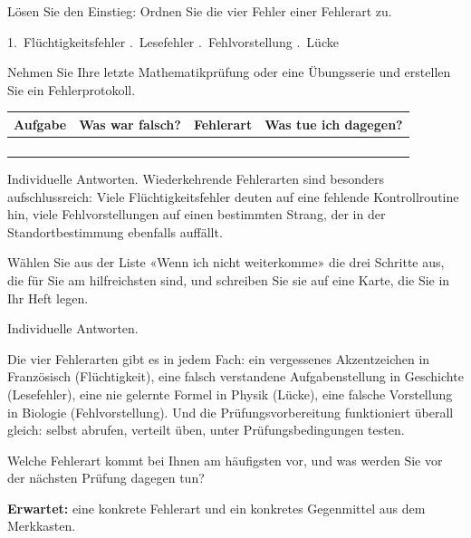 \documentclass[11pt]{exam}
\begin{document}
\begin{questions}

\question Lösen Sie den Einstieg: Ordnen Sie die vier Fehler einer Fehlerart
zu.
\begin{solution}
  1.\ Flüchtigkeitsfehler .\ Lesefehler .\ Fehlvorstellung
  .\ Lücke
\end{solution}
\zeilen{2cm}

\question Nehmen Sie Ihre letzte Mathematikprüfung oder eine Übungsserie und
erstellen Sie ein Fehlerprotokoll.

\begin{center}
\renewcommand{\arraystretch}{2}
\begin{tabular}{|p{1.6cm}|p{4.2cm}|p{3.2cm}|p{4.2cm}|}
  \hline
  \textbf{Aufgabe} & \textbf{Was war falsch?} & \textbf{Fehlerart} &
  \textbf{Was tue ich dagegen?} \\ \hline
  & & & \\ \hline
  & & & \\ \hline
  & & & \\ \hline
  & & & \\ \hline
\end{tabular}
\end{center}
\begin{solution}
  Individuelle Antworten. Wiederkehrende Fehlerarten sind besonders
  aufschlussreich: Viele Flüchtigkeitsfehler deuten auf eine fehlende
  Kontrollroutine hin, viele Fehlvorstellungen auf einen bestimmten Strang,
  der in der Standortbestimmung ebenfalls auffällt.
\end{solution}

\question Wählen Sie aus der Liste «Wenn ich nicht weiterkomme» die drei
Schritte aus, die für Sie am hilfreichsten sind, und schreiben Sie sie auf
eine Karte, die Sie in Ihr Heft legen.
\begin{solution}
  Individuelle Antworten.
\end{solution}

\end{questions}

\begin{transfer}
Die vier Fehlerarten gibt es in jedem Fach: ein vergessenes Akzentzeichen in
Französisch (Flüchtigkeit), eine falsch verstandene Aufgabenstellung in
Geschichte (Lesefehler), eine nie gelernte Formel in Physik (Lücke), eine
falsche Vorstellung in Biologie (Fehlvorstellung). Und die
Prüfungsvorbereitung funktioniert überall gleich: selbst abrufen, verteilt
üben, unter Prüfungsbedingungen testen.
\end{transfer}

\begin{exitfrage}
Welche Fehlerart kommt bei Ihnen am häufigsten vor, und was werden Sie vor
der nächsten Prüfung dagegen tun?
\ifprintanswers\par\medskip\textbf{Erwartet:} eine konkrete Fehlerart und ein
konkretes Gegenmittel aus dem Merkkasten.
\else\par\vspace{1.5cm}\fi
\end{exitfrage}
\end{document}
